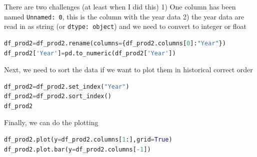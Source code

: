 \documentclass[%
twoside,                 %
final,                   %
10pt]{article}
\begin{document}
There are two challenges (at least when I did this) 1) One column has been named \texttt{Unnamed: 0}, this is the column with the year data 2) the year data are read in as string (or \texttt{dtype: object}) and we need to convert to integer or float



\begin{lstlisting}[language=Python,style=blue1bar]
df_prod2=df_prod2.rename(columns={df_prod2.columns[0]:"Year"})
df_prod2['Year']=pd.to_numeric(df_prod2['Year'])

\end{lstlisting}

Next, we need to sort the data if we want to plot them in historical correct order




\begin{lstlisting}[language=Python,style=blue1bar]
df_prod2=df_prod2.set_index("Year")
df_prod2=df_prod2.sort_index()
df_prod2

\end{lstlisting}

Finally, we can do the plotting



\begin{lstlisting}[language=Python,style=blue1bar]
df_prod2.plot(y=df_prod2.columns[1:],grid=True)
df_prod2.plot.bar(y=df_prod2.columns[-1])

\end{lstlisting}



\end{document}
